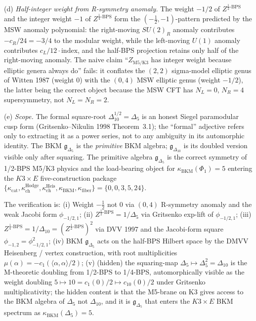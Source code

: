 \begin{remark}
\textup{(d)} \emph{Half-integer weight from R-symmetry anomaly.}
The weight $-1/2$ of $Z^{\tfrac12\text{-BPS}}$ and the integer weight
$-1$ of $Z^{\tfrac14\text{-BPS}}$ form the $(-\tfrac12,-1)$-pattern
predicted by the MSW anomaly polynomial: the right-moving $SU(2)_R$
anomaly contributes $-c_R/24 = -3/4$ to the modular weight, while
the left-moving $U(1)$ anomaly contributes $c_L/12\cdot\mathrm{index}$,
and the half-BPS projection retains only half of the right-moving
anomaly. The naive claim ``$Z_{\mathrm{M5}/\mathrm{K3}}$ has integer
weight because elliptic genera always do'' fails: it conflates the
$(2,2)$ sigma-model elliptic genus of Witten 1987 (weight $0$) with
the $(0,4)$ MSW elliptic genus (weight $-1/2$), the latter being the
correct object because the MSW CFT has
$N_L = 0$, $N_R = 4$ supersymmetry, not $N_L = N_R = 2$.

\textup{(e)} \emph{Scope.} The formal square-root
$\Delta_{10}^{1/2}=\Delta_5$ is an honest Siegel paramodular cusp form
(Gritsenko--Nikulin 1998 Theorem~3.1); the ``formal'' adjective
refers only to extracting it as a power series, not to any ambiguity
in its automorphic identity. The BKM $\mathfrak g_{\Delta_5}$ is the
\emph{primitive} BKM algebra; $\mathfrak g_{\Delta_{10}}$ is its
doubled version visible only after squaring. The primitive algebra
$\mathfrak g_{\Delta_5}$ is the correct symmetry of 1/2-BPS M5/K3
physics and the load-bearing object for
$\kappa_{\mathrm{BKM}}(\Phi_1)=5$ entering the $K3\times E$
five-construction package
$\{\kappa_{\mathrm{cat}}, \kappa_{\mathrm{ch}}^{\mathrm{Hodge}},
\kappa_{\mathrm{ch}}^{\mathrm{Heis}}, \kappa_{\mathrm{BKM}},
\kappa_{\mathrm{fiber}}\} = \{0,0,3,5,24\}$.

The verification is:
\textup{(i)} Weight $-\tfrac12$ not $0$ via $(0,4)$ R-symmetry
anomaly and the weak Jacobi form $\phi_{-1/2,1}$;
\textup{(ii)} $Z^{\tfrac12\text{-BPS}} = 1/\Delta_5$ via Gritsenko
exp-lift of $\phi_{-1/2,1}$;
\textup{(iii)} $Z^{\tfrac14\text{-BPS}} = 1/\Delta_{10} =
(Z^{\tfrac12\text{-BPS}})^2$ via DVV 1997 and the Jacobi-form square
$\phi_{-1,2} = \phi_{-1/2,1}^2$;
\textup{(iv)} BKM $\mathfrak g_{\Delta_5}$ acts on the half-BPS
Hilbert space by the DMVV Heisenberg / vertex construction, with
root multiplicities
$\mu(\alpha) = -c_1(\langle\alpha,\alpha\rangle/2)$;
\textup{(v)} (hidden) the squaring-map
$\Delta_5 \mapsto \Delta_5^2 = \Delta_{10}$ is the M-theoretic
doubling from 1/2-BPS to 1/4-BPS, automorphically visible as the
weight doubling $5\mapsto 10 = c_1(0)/2 \mapsto c_{10}(0)/2$
under Gritsenko multiplicativity; the hidden content is that
the M5-brane on K3 gives access to the BKM algebra of
$\Delta_5$ not $\Delta_{10}$, and it is $\mathfrak g_{\Delta_5}$ that
enters the $K3\times E$ BKM spectrum as $\kappa_{\mathrm{BKM}}(\Delta_5)=5$.
\end{remark}

